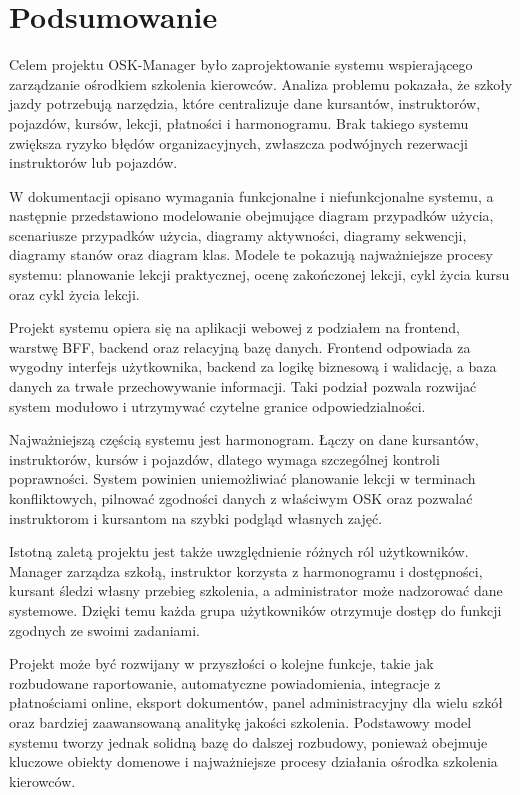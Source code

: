 \chapter{Podsumowanie}
\label{cha:podsumowanie}

Celem projektu OSK-Manager było zaprojektowanie systemu wspierającego zarządzanie ośrodkiem szkolenia kierowców. Analiza problemu pokazała, że szkoły jazdy potrzebują narzędzia, które centralizuje dane kursantów, instruktorów, pojazdów, kursów, lekcji, płatności i harmonogramu. Brak takiego systemu zwiększa ryzyko błędów organizacyjnych, zwłaszcza podwójnych rezerwacji instruktorów lub pojazdów.

W dokumentacji opisano wymagania funkcjonalne i niefunkcjonalne systemu, a następnie przedstawiono modelowanie obejmujące diagram przypadków użycia, scenariusze przypadków użycia, diagramy aktywności, diagramy sekwencji, diagramy stanów oraz diagram klas. Modele te pokazują najważniejsze procesy systemu: planowanie lekcji praktycznej, ocenę zakończonej lekcji, cykl życia kursu oraz cykl życia lekcji.

Projekt systemu opiera się na aplikacji webowej z podziałem na frontend, warstwę BFF, backend oraz relacyjną bazę danych. Frontend odpowiada za wygodny interfejs użytkownika, backend za logikę biznesową i walidację, a baza danych za trwałe przechowywanie informacji. Taki podział pozwala rozwijać system modułowo i utrzymywać czytelne granice odpowiedzialności.

Najważniejszą częścią systemu jest harmonogram. Łączy on dane kursantów, instruktorów, kursów i pojazdów, dlatego wymaga szczególnej kontroli poprawności. System powinien uniemożliwiać planowanie lekcji w terminach konfliktowych, pilnować zgodności danych z właściwym OSK oraz pozwalać instruktorom i kursantom na szybki podgląd własnych zajęć.

Istotną zaletą projektu jest także uwzględnienie różnych ról użytkowników. Manager zarządza szkołą, instruktor korzysta z harmonogramu i dostępności, kursant śledzi własny przebieg szkolenia, a administrator może nadzorować dane systemowe. Dzięki temu każda grupa użytkowników otrzymuje dostęp do funkcji zgodnych ze swoimi zadaniami.

Projekt może być rozwijany w przyszłości o kolejne funkcje, takie jak rozbudowane raportowanie, automatyczne powiadomienia, integracje z płatnościami online, eksport dokumentów, panel administracyjny dla wielu szkół oraz bardziej zaawansowaną analitykę jakości szkolenia. Podstawowy model systemu tworzy jednak solidną bazę do dalszej rozbudowy, ponieważ obejmuje kluczowe obiekty domenowe i najważniejsze procesy działania ośrodka szkolenia kierowców.
